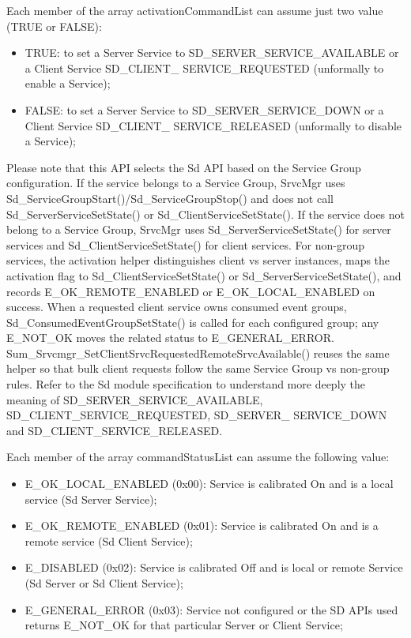 Each member of the array activationCommandList can assume just two value (TRUE or FALSE):
\begin{itemize}
\item TRUE: to set a Server Service to SD\_SERVER\_SERVICE\_AVAILABLE or a Client Service SD\_CLIENT\_ SERVICE\_REQUESTED (unformally to enable a Service);
\item FALSE: to set a Server Service to SD\_SERVER\_SERVICE\_DOWN or a Client Service SD\_CLIENT\_ SERVICE\_RELEASED (unformally to disable a Service); 
\end{itemize}
Please note that this API selects the Sd API based on the Service Group configuration. If the service belongs to a Service Group, SrvcMgr uses Sd\_ServiceGroupStart()/Sd\_ServiceGroupStop() and does not call Sd\_ServerServiceSetState() or Sd\_ClientServiceSetState(). If the service does not belong to a Service Group, SrvcMgr uses Sd\_ServerServiceSetState() for server services and Sd\_ClientServiceSetState() for client services.
For non-group services, the activation helper distinguishes client vs server instances, maps the activation flag to Sd\_ClientServiceSetState() or Sd\_ServerServiceSetState(), and records E\_OK\_REMOTE\_ENABLED or E\_OK\_LOCAL\_ENABLED on success. When a requested client service owns consumed event groups, Sd\_ConsumedEventGroupSetState() is called for each configured group; any E\_NOT\_OK moves the related status to E\_GENERAL\_ERROR. Sum\_Srvcmgr\_SetClientSrvcRequestedRemoteSrvcAvailable() reuses the same helper so that bulk client requests follow the same Service Group vs non-group rules.
Refer to the Sd module specification to understand more deeply the meaning of SD\_SERVER\_SERVICE\_AVAILABLE, SD\_CLIENT\_SERVICE\_REQUESTED, SD\_SERVER\_ SERVICE\_DOWN and SD\_CLIENT\_SERVICE\_RELEASED.


Each member of the array commandStatusList can assume the following value:
\begin{itemize}
\item E\_OK\_LOCAL\_ENABLED (0x00): Service is calibrated On and is a local service (Sd Server Service); 
\item E\_OK\_REMOTE\_ENABLED (0x01): Service is calibrated On and is a remote service (Sd Client Service);
\item E\_DISABLED (0x02): Service is calibrated Off and is local or remote Service (Sd Server or Sd Client Service);
\item E\_GENERAL\_ERROR (0x03): Service not configured or the SD APIs used returns E\_NOT\_OK for that particular Server or Client Service; 
\end{itemize}

